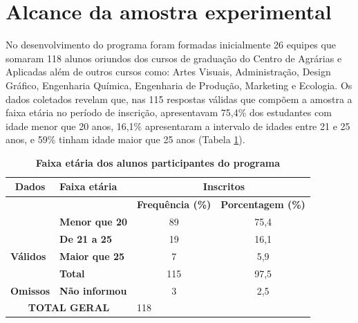 \section{Alcance da amostra experimental}

No desenvolvimento do programa foram formadas inicialmente 26 equipes que somaram 118 alunos oriundos dos cursos de graduação do Centro de Agrárias e Aplicadas além de outros cursos como: Artes Visuais, Administração, Design Gráfico, Engenharia Química, Engenharia de Produção, Marketing e Ecologia.
Os dados coletados revelam que, nas 115 respostas válidas que compõem a amostra a faixa etária no período de inscrição, apresentavam 75,4\% dos estudantes com idade menor que 20 anos, 16,1\% apresentaram a intervalo de idades entre 21 e 25 anos, e 59\% tinham idade maior que 25 anos (Tabela \ref{tabela_45}).
 
\begin{table}[H]
\centering
\caption{\textbf{Faixa etária dos alunos participantes do programa}}
\label{tabela_45}
\begin{tabular}{clcc} 
\hline\hline
 \textbf{Dados}                       & \textbf{Faixa etária}  & \multicolumn{2}{c}{~\textbf{Inscritos} }                                                        \\ 
\hline
\multirow{3}{*}{}                     &                        & \multicolumn{1}{l}{\textbf{Frequência (\%)} } & \multicolumn{1}{l}{\textbf{Porcentagem (\%)} }  \\
                                      & \textbf{Menor que 20}  & 89                                            & 75,4                                            \\
                                      & \textbf{De 21 a 25}    & 19                                            & 16,1                                            \\
\multicolumn{1}{l}{\textbf{Válidos} } & \textbf{Maior que 25}  & 7                                             & 5,9                                             \\
\multicolumn{1}{l}{}                  & \textbf{Total}         & 115                                           & 97,5                                            \\ 
\hline
\multicolumn{1}{l}{\textbf{Omissos} } & \textbf{Não informou}  & 3                                             & 2,5                                             \\ 
\hline
\multicolumn{2}{c}{\textbf{TOTAL GERAL} }                      & \multicolumn{1}{l}{118}                       &                                                 \\
\hline\hline
\end{tabular}
\end{table}


